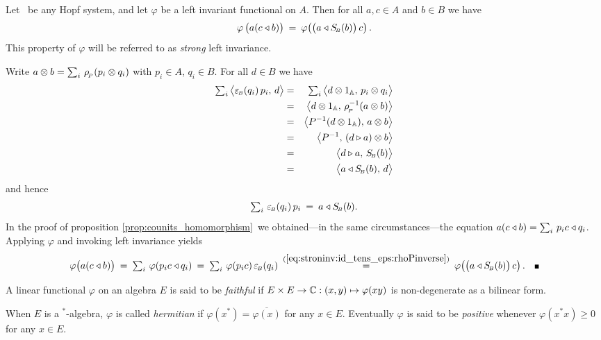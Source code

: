 \begin{prop_sec} \label{prop:strong_left_invariance}
Let\/ \pairAB\ be any Hopf system, and let\/ $\varphi$ be a left invariant functional on $A$.
Then\/ for all\/ $a,c\in A$ and\/ $b\in B$ we have
$$ \varphi\left(a(c \ract b)\vertM\right)
      \:=\: \varphi \! \left(\left(a \ract \SB(b)\vertM\right)c \right). $$
\rm This property of $\varphi$ will be referred to as {\em strong\/} left invariance.
\end{prop_sec}
\begin{proof*}
Write $a \otimes b = \sum_i \,\rho_{_{\!P}}(p_i \otimes q_i)$ with $p_i \in A$, $q_i \in B$.
For all $d\in B$ we have
\begin{eqnarray*}
\textstyle \sum_i  \pairM{\epsB(q_i) \, p_i}{d}
  &=&
\textstyle \sum_i  \pairM{d \tens 1_\Aa}{p_i \tens q_i}
\\&=&
\pairM{d \tens 1_\Aa}{\rp^{-1}(a \tens b)}
\\&=&
\pairM{P^{-1} (d \tens 1_\Aa)}{a \tens b}
\\&=&
\pairM{P^{-1}}{(d \lact a) \tens b}
\\&=&
\pairM{d \lact a}{\SB(b)}
\\&=&
\pairM{a \ract \SB(b)}{d}
\end{eqnarray*}
and hence
\begin{equation}\label{eq:stroninv:id_tens_eps:rhoPinverse}
  \textstyle \sum_i \, \varepsilon_{\scriptscriptstyle \! B}(q_i) \, p_i \:=\: a \triangleleft S_{\scriptscriptstyle \! B}(b).
\end{equation}
In the proof of proposition \ref{prop:counits_homomorphism}\ we
obtained---in the same circumstances---the equation
$a(c \triangleleft b) = \sum_i \,  p_i c \triangleleft q_i$.
Applying $\varphi$ and invoking left invariance yields
$$ \varphi \! \left(a(c \ract b)\vertM\right)
   \:=\:
          \textstyle \sum_i \, \varphi(p_i c \ract q_i)
   \:=\:
          \textstyle \sum_i \, \varphi(p_i c) \, \epsB(q_i)
   \:\stackrel{(\ref{eq:stroninv:id_tens_eps:rhoPinverse})}{=}\:
          \varphi \! \left(\left(a \ract \SB(b)\vertM\right)c \right). \hspace{1em} \qed $$
\end{proof*}



\begin{defn_sec}  \label{def:faithful:hermitian:positive}
A linear functional $\varphi$ on an algebra $E$ is said to be {\em faithful\/} if
$E \times E \rightarrow \mathbb{C}: (x,y) \mapsto \varphi(xy)$ is non-degenerate as a bilinear form.

When $E$ is a $^*$-algebra, $\varphi$ is called {\em hermitian\/} if
$\varphi(x^*) = \overline{\varphi(x)}$ for any $x\in E$.
Eventually $\varphi$ is said to be {\em positive\/} whenever $\varphi(x^*x)\geq 0$ for any $x\in E$.
\end{defn_sec}


